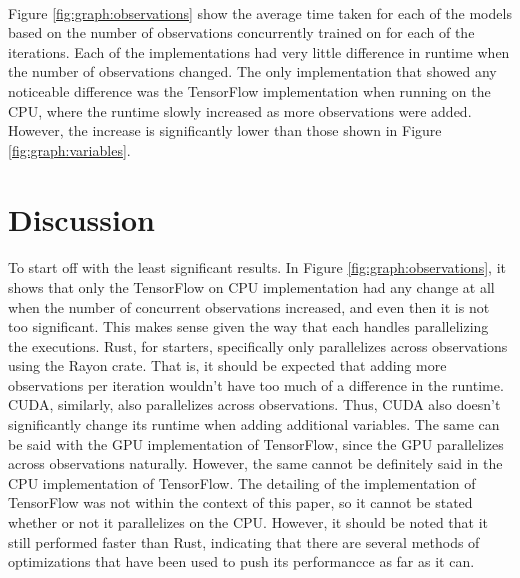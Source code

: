 \documentclass[12pt]{article}
\begin{document}
\paragraph{}
Figure \ref{fig:graph:observations} show the average time taken for each of the models based on the number of observations concurrently trained on for each of the iterations.
Each of the implementations had very little difference in runtime when the number of observations changed.
The only implementation that showed any noticeable difference was the TensorFlow implementation when running on the CPU, where the runtime slowly increased as more observations were added.
However, the increase is significantly lower than those shown in Figure \ref{fig:graph:variables}.

\section{Discussion}

\paragraph{}
To start off with the least significant results. In Figure \ref{fig:graph:observations}, it shows that only the TensorFlow on CPU implementation had any change at all when the number of concurrent observations increased, and even then it is not too significant.
This makes sense given the way that each handles parallelizing the executions.
Rust, for starters, specifically only parallelizes across observations using the Rayon \cite{lib_rayon} crate.
That is, it should be expected that adding more observations per iteration wouldn't have too much of a difference in the runtime.
CUDA, similarly, also parallelizes across observations.
Thus, CUDA also doesn't significantly change its runtime when adding additional variables. 
The same can be said with the GPU implementation of TensorFlow, since the GPU parallelizes across observations naturally.
However, the same cannot be definitely said in the CPU implementation of TensorFlow.
The detailing of the implementation of TensorFlow was not within the context of this paper, so it cannot be stated whether or not it parallelizes on the CPU.
However, it should be noted that it still performed faster than Rust, indicating that there are several methods of optimizations that have been used to push its performancce as far as it can.
\end{document}

